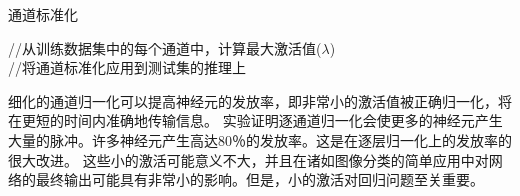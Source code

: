 \begin{algorithm}[H]
	\caption{通道标准化}%
	//从训练数据集中的每个通道中，计算最大激活值($\lambda$) \\
	\LinesNumbered %
	//将通道标准化应用到测试集的推理上 \\
\end{algorithm}
\par
细化的通道归一化可以提高神经元的发放率，即非常小的激活值被正确归一化，将在更短的时间内准确地传输信息。
实验证明逐通道归一化会使更多的神经元产生大量的脉冲。许多神经元产生高达80％的发放率。这是在逐层归一化上的发放率的很大改进。
这些小的激活可能意义不大，并且在诸如图像分类的简单应用中对网络的最终输出可能具有非常小的影响。但是，小的激活对回归问题至关重要。
